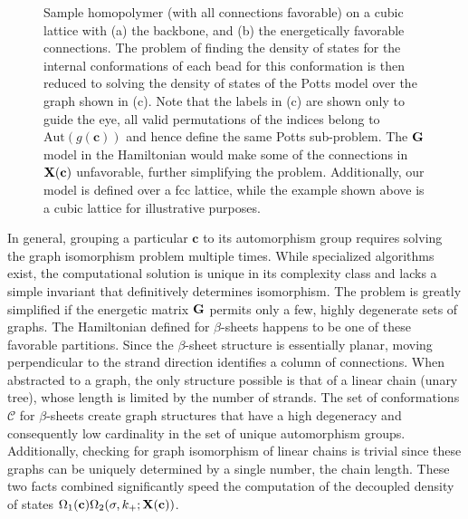 \begin{figure}[ht]
\caption{Sample homopolymer (with all connections favorable) on a cubic lattice with (a) the backbone, and (b) the energetically favorable connections. The problem of finding the density of states for the internal conformations of each bead for this conformation is then reduced to solving the density of states of the Potts model over the graph shown in (c). Note that the labels in (c) are shown only to guide the eye, all valid permutations of the indices belong to $\text{Aut}( g(\mathbf{c}) )$ and hence define the same Potts sub-problem. The $\textbf{G}$ model in the Hamiltonian would make some of the connections in $\mathbf{X}(\mathbf{c})$ unfavorable, further simplifying the problem. Additionally, our model is defined over a fcc lattice, while the example shown above is a cubic lattice for illustrative purposes.}
\end{figure}

In general, grouping a particular $\mathbf{c}$ to its automorphism group requires solving the graph isomorphism problem multiple times. While specialized algorithms exist,\cite{mckay_practical_1981} the computational solution is unique in its complexity class and lacks a simple invariant that definitively determines isomorphism.\cite{kaebler_graph_1993} The problem is greatly simplified if the energetic matrix $\textbf{G}$ permits only a few, highly degenerate sets of graphs. The Hamiltonian defined for $\beta$-sheets happens to be one of these favorable partitions. Since the $\beta$-sheet structure is essentially planar, moving perpendicular to the strand direction identifies a column of connections. When abstracted to a graph, the only structure possible is that of a linear chain (unary tree), whose length is limited by the number of strands. The set of conformations $\mathcal{C}$ for $\beta$-sheets create graph structures that have a high degeneracy and consequently low cardinality in the set of unique automorphism groups. Additionally, checking for graph isomorphism of linear chains is trivial since these graphs can be uniquely determined by a single number, the chain length. These two facts combined significantly speed the computation of the decoupled density of states $\Omega_1 (\mathbf{c}) \Omega_2 (\sigma, k_+; \mathbf{X}(\mathbf{c}))$.

